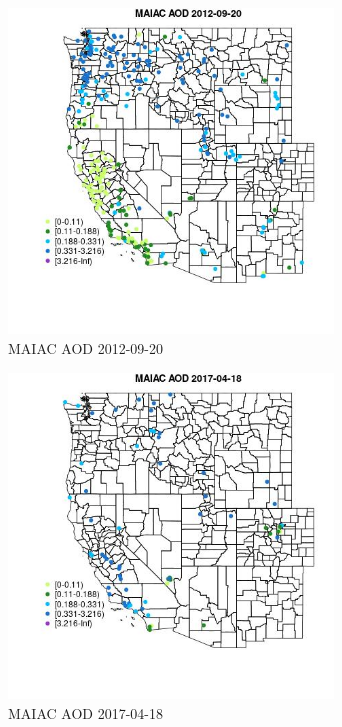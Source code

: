 \begin{figure} 
\centering  
\includegraphics[width=0.77\textwidth]{Code_Outputs/Report_ML_input_PM25_Step4_part_e_de_duplicated_aves_compiled_2019-05-14wNAs_MapObsMAIAC_AOD2012-09-20.jpg} 
\caption{\label{fig:Report_ML_input_PM25_Step4_part_e_de_duplicated_aves_compiled_2019-05-14wNAsMapObsMAIAC_AOD2012-09-20}MAIAC AOD 2012-09-20} 
\end{figure} 
 

\begin{figure} 
\centering  
\includegraphics[width=0.77\textwidth]{Code_Outputs/Report_ML_input_PM25_Step4_part_e_de_duplicated_aves_compiled_2019-05-14wNAs_MapObsMAIAC_AOD2017-04-18.jpg} 
\caption{\label{fig:Report_ML_input_PM25_Step4_part_e_de_duplicated_aves_compiled_2019-05-14wNAsMapObsMAIAC_AOD2017-04-18}MAIAC AOD 2017-04-18} 
\end{figure} 
 

